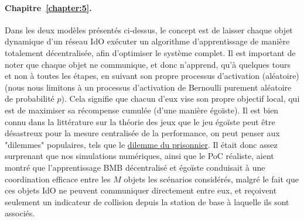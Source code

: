 \begin{resume_fr}
\paragraph{Chapitre~\ref{chapter:5}.}
%
Dans les deux modèles présentés ci-dessus, le concept est de laisser chaque objet dynamique d'un réseau IdO exécuter un algorithme d'apprentissage de manière totalement décentralisée, afin d'optimiser le système complet.
Il est important de noter que chaque objet ne communique, et donc n'apprend, qu'à quelques tours et non à toutes les étapes, en suivant son propre processus d'activation (aléatoire) (nous nous limitons à un processus d'activation de Bernoulli purement aléatoire de probabilité $p$).
Cela signifie que chacun d'eux vise son propre objectif local, qui est de maximiser sa récompense cumulée (d'une manière égoïste).
Il est bien connu dans la littérature sur la théorie des jeux que le jeu égoïste peut être désastreux pour la mesure centralisée de la performance, on peut penser aux "dilemmes" populaires, tels que le \href{https://fr.wikipedia.org/wiki/Dilemme_du_prisonnier}{dilemme du prisonnier}.
Il était donc assez surprenant que nos simulations numériques, ainsi que le PoC réaliste, aient montré que l'apprentissage BMB décentralisé et égoïste conduisait à une coordination efficace entre les $M$ objets les scénarios considérés, malgré le fait que ces objets IdO ne peuvent communiquer directement entre eux, et reçoivent seulement un indicateur de collision depuis la station de base à laquelle ils sont associés.


\end{resume_fr}
